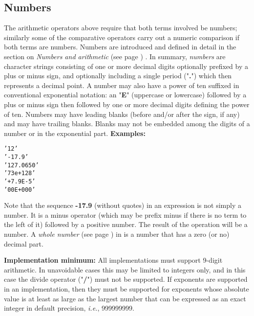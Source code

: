 \subsection{Numbers}\label{refnumdef}
 The arithmetic operators above require that both terms involved be
numbers; similarly some of the comparative operators carry out a
numeric comparison if both terms are numbers.
 Numbers are introduced and defined in detail in the section
on  \emph{Numbers and arithmetic} (see page \pageref{refnums}) .
In summary, \emph{numbers} are character strings consisting of one or
more decimal digits optionally prefixed by a plus or minus sign, and
optionally including a single period ("\textbf{.}") which then
represents a decimal point.
A number may also have a power of ten suffixed in conventional
exponential notation: an "\textbf{E}" (uppercase or lowercase)
followed by a plus or minus sign then followed by one or more decimal
digits defining the power of ten.
 Numbers may have leading blanks (before and/or after the sign, if
any) and may have trailing blanks.
Blanks may not be embedded among the digits of a number or in the
exponential part.
 \textbf{Examples:}
\begin{alltt}
'12'
'-17.9'
'127.0650'
'73e+128'
' + 7.9E-5 '
'00E+000'
\end{alltt}
 Note that the sequence \textbf{-17.9} (without quotes) in an
expression is not simply a number.
It is a minus operator (which may be prefix minus if there is no term
to the left of it) followed by a positive number.
The result of the operation will be a number.
 A  \emph{whole number} (see page \pageref{refwholed})  in \nr{} is a number
that has a zero (or no) decimal part.
 
\textbf{Implementation minimum:}
All implementations must support 9-digit arithmetic.
In unavoidable cases this may be limited to integers only, and in this
case the divide operator ("\textbf{/}") must not be supported.
If exponents are supported in an implementation, then they must be
supported for exponents whose absolute value is at least as large as the
largest number that can be expressed as an exact integer in default
precision, \emph{i.e.}, 999999999.
